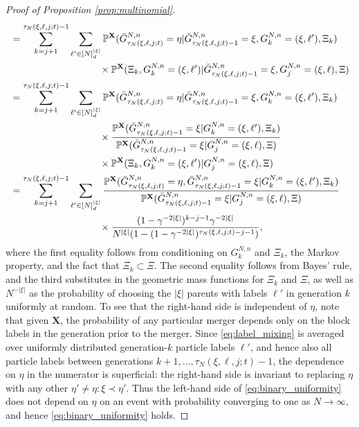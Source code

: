 \documentclass[a4paper,11pt]{article}
\theoremstyle{definition}
\newcommand{\bbP}{\mathbb{P}}
\newcommand{\bfX}{\mathbf{X}}
\begin{document}
\begin{proof}[Proof of Proposition \ref{prop:multinomial}]
\begin{align}
&= \sum_{k = j + 1}^{\tau_N(\xi, \ell, j; t) - 1} \sum_{\ell' \in [N]_d^{|\xi|}} \bbP^{\bfX}(\bar{ G }_{ \tau_N( \xi, \ell, j; t ) }^{ N, n } = \eta | \bar{ G }_{ \tau_N( \xi, \ell, j; t ) - 1 }^{ N, n } = \xi, G_k^{N, n} = (\xi, \ell'), \Xi_k) \notag \\
&\mspace{166mu} \times \bbP^{\bfX}(\Xi_k, G_k^{ N, n } = ( \xi, \ell' ) | \bar{ G }_{ \tau_N( \xi, \ell, j; t ) - 1 }^{ N, n } = \xi, G_j^{ N, n } = ( \xi, \ell ), \Xi) \notag \\
&= \sum_{k = j + 1}^{\tau_N(\xi, \ell, j; t) - 1} \sum_{\ell' \in [N]_d^{|\xi|}} \bbP^{\bfX}(\bar{ G }_{ \tau_N( \xi, \ell, j; t ) }^{ N, n } = \eta | \bar{ G }_{ \tau_N( \xi, \ell, j; t ) - 1 }^{ N, n } = \xi, G_k^{N, n} = (\xi, \ell'), \Xi_k) \notag \\
&\mspace{166mu} \times \frac{\bbP^{\bfX}(\bar{ G }_{ \tau_N( \xi, \ell, j; t ) - 1 }^{ N, n } = \xi | G_k^{ N, n } = ( \xi, \ell' ), \Xi_k)}{\bbP^{\bfX}(\bar{ G }_{ \tau_N( \xi, \ell, j; t ) - 1 }^{ N, n } = \xi | G_j^{ N, n } = ( \xi, \ell ), \Xi)} \notag \\
&\mspace{166mu} \times \bbP^{\bfX}(\Xi_k, G_k^{ N, n } = ( \xi, \ell' ) | G_j^{ N, n } = ( \xi, \ell ), \Xi) \notag \\
&= \sum_{k = j + 1}^{\tau_N(\xi, \ell, j; t) - 1} \sum_{\ell' \in [N]_d^{|\xi|}} \frac{\bbP^{\bfX}(\bar{ G }_{ \tau_N( \xi, \ell, j; t ) }^{ N, n } = \eta, \bar{ G }_{ \tau_N( \xi, \ell, j; t ) - 1 }^{ N, n } = \xi | G_k^{N, n} = (\xi, \ell'), \Xi_k)}{\bbP^{\bfX}(\bar{ G }_{ \tau_N( \xi, \ell, j; t ) - 1 }^{ N, n } = \xi | G_j^{ N, n } = ( \xi, \ell ), \Xi)}\notag \\
&\mspace{166mu} \times \frac{(1 - \gamma^{-2 |\xi|})^{k - j - 1} \gamma^{-2|\xi|}}{N^{|\xi|} (1 - (1 - \gamma^{-2 |\xi|})^{\tau_N(\xi, \ell, j;t) - j - 1})}, \label{eq:label_mixing}
\end{align}
where the first equality follows from conditioning on $G_k^{N, n}$ and $\Xi_k$, the Markov property, and the fact that $\Xi_k \subset \Xi$.
The second equality follows from Bayes' rule, and the third substitutes in the geometric mass functions for $\Xi_k$ and $\Xi$, as well as $N^{-|\xi|}$ as the probability of choosing the $|\xi|$ parents with labels $\ell'$ in generation $k$ uniformly at random.
To see that the right-hand side is independent of $\eta$, note that given $\bfX$, the probability of any particular merger depends only on the block labels in the generation prior to the merger.
Since \eqref{eq:label_mixing} is averaged over uniformly distributed generation-$k$ particle labels $\ell'$, and hence also all particle labels between generations $k + 1, \ldots, \tau_N(\xi, \ell, j; t) - 1$, the dependence on $\eta$ in the numerator is superficial: the right-hand side is invariant to replacing $\eta$ with any other $\eta' \neq \eta : \xi \prec \eta'$.
Thus the left-hand side of \eqref{eq:binary_uniformity} does not depend on $\eta$ on an event with probability converging to one as $N \to \infty$, and hence \eqref{eq:binary_uniformity} holds.


\end{proof}
\end{document}
